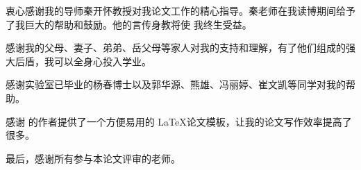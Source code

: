 \begin{acknowledgement}
  衷心感谢我的导师秦开怀教授对我论文工作的精心指导。秦老师在我读博期间给予了我巨大的帮助和鼓励。他的言传身教将使
  我终生受益。\par
  感谢我的父母、妻子、弟弟、岳父母等家人对我的支持和理解，有了他们组成的强大后盾，我可以全身心投入学业。\par
  感谢实验室已毕业的杨春博士以及郭华源、熊雄、冯丽婷、崔文凯等同学对我的帮助。\par

  感谢 \thuthesis 的作者提供了一个方便易用的 \LaTeX 论文模板，让我的论文写作效率提高了很多。\par
  最后，感谢所有参与本论文评审的老师。
\end{acknowledgement}
